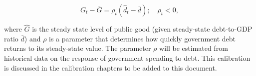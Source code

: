       \begin{equation}
         G_{t} - \bar{G} = \rho_t (\hat{d}_t - \bar{d});\quad \rho_t<0, 
        \label{EqAdjRule}
      \end{equation}

\noindent\noindent where $\hat{G}$ is the steady state level of public good (given steady-state debt-to-GDP ratio $\bar{d}$) and $\rho$ is a parameter that determines how quickly government debt returns to its steady-state value.  The parameter $\rho$ will be estimated from historical data on the response of government spending to debt.  This calibration is discussed in the calibration chapters to be added to this document.  
%
%
%
%
%
